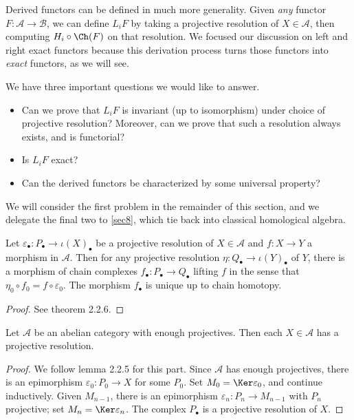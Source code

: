 \begin{remark}\label{7.14}
	Derived functors can be defined in much more generality. Given \emph{any} functor $F : \mathcal{A}  \to \mathcal{B} $, we can define $L_iF$ by taking a projective resolution of $X\in \mathcal{A} $, then computing $H_i \circ \Ch(F) $ on that resolution. We focused our discussion on left and right exact functors because this derivation process turns those functors into \emph{exact} functors, as we will see.
\end{remark}

We have three important questions we would like to answer.
\begin{itemize}
	\item Can we prove that $L_iF$ is invariant (up to isomorphism) under choice of projective resolution? Moreover, can we prove that such a resolution always exists, and is functorial?
	\item Is $L_iF$ exact?
	\item Can the derived functors be characterized by some universal property?
\end{itemize}
We will consider the first problem in the remainder of this section, and we delegate the final two to \cref{sec8}, which tie back into classical homological algebra.

\begin{theorem}\label{7.15}
	Let $\varepsilon _{\bullet} : P_{\bullet}  \to \iota (X)_{\bullet} $ be a projective resolution of $X\in \mathcal{A} $ and $f : X \to Y$ a morphism in $\mathcal{A} $. Then for any projective resolution $\eta : Q_{\bullet}  \to \iota (Y)_{\bullet} $ of $Y$, there is a morphism of chain complexes $f_{\bullet} : P_{\bullet}  \to Q_{\bullet} $ lifting $f$ in the sense that $\eta_0 \circ f_0=f\circ \varepsilon_0 $. The morphism $f_{\bullet} $ is unique up to chain homotopy.
\end{theorem}
\begin{proof}
	See \cite[2.2]{weibel} theorem 2.2.6.
\end{proof}

\begin{lemma}\label{7.16}
	Let $\mathcal{A} $ be an abelian category with enough projectives. Then each $X\in \mathcal{A} $ has a projective resolution.
\end{lemma}
\begin{proof}
	We follow \cite[2.2]{weibel} lemma 2.2.5 for this part. Since $\mathcal{A} $ has enough projectives, there is an epimorphism $\varepsilon_0 :P_0\to X$ for some $P_0$. Set $M_0=\Ker \varepsilon_0 $, and continue inductively. Given $M_{n-1} $, there is an epimorphism $\varepsilon _n : P_n \to M_{n-1} $ with $P_n$ projective; set $M_n=\Ker \varepsilon _n$. The complex $P_{\bullet} $ is a projective resolution of $X$.
\end{proof}

